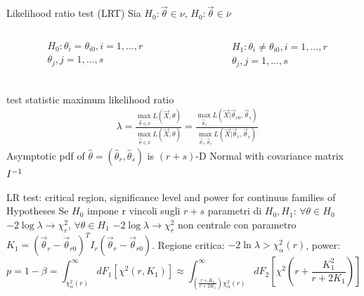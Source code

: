\documentclass[asd-beamer.tex]{subfiles}
\begin{document}
\begin{frame}{Likelihood ratio test (LRT)}\frameintoc{}
Sia $H_0: \vec{\theta}\in\nu$, $H_0: \vec{\theta}\in\overline{\nu}$
\begin{columns}[T]
\begin{column}{0.4\textwidth}
\begin{align*}
&H_0: \theta_i=\theta_{i0}, i=1,\ldots,r\\
&\theta_j, j=1,\ldots,s\\
\end{align*}
\end{column}
\begin{column}{0.6\textwidth}
\begin{align*}
&H_1: \theta_i\neq\theta_{i0}, i=1,\ldots,r\\
&\theta_j, j=1,\ldots,s
\end{align*}
\end{column}
\end{columns}
\begin{block}{test statistic maximum likelihood ratio}
\begin{align*}
&\lambda=\frac{\max_{\vec{\theta}\in\nu}L(\vec{X},\theta)}{\max_{\vec{\theta}\in\overline{\nu}}L(\vec{X},\theta)}=\frac{\max_{\vec{\theta}_s}L(\vec{X}|\vec{\theta}_{r0},\vec{\theta}_s)}{\max_{\vec{\theta}_r, \vec{\theta}_s}L(\vec{X}|\vec{\theta}_r,\vec{\theta}_s)}
\end{align*}
Asymptotic pdf of $\hat{\theta}=(\hat{\theta}_r,\hat{\theta}_s)$ is $(r+s)$-D Normal with covariance matrix ${I}^{-1}$
\end{block}
\end{frame}

\begin{frame}{LR test: critical region, significance level and power for continuus families of Hypotheses}
	Se $H_0$ impone r vincoli sugli $r+s$ parametri di $H_0, H_1$: $\forall\theta\in H_0$ $-2\log{\lambda}\to\chi^2_{r}$, $\forall\theta\in H_1$ $-2\log{\lambda}\to\chi^2_{r}$ non centrale con parametro $K_1=(\vec{\theta}_r-\vec{\theta}_{r0})^TI_r(\vec{\theta}_r-\vec{\theta}_{r0})$.
	Regione critica: $-2\ln{\lambda}>\chi^2_{\alpha}(r)$, power:
	\begin{equation*}
	p=1-\beta=\int_{\chi_{\alpha}^2(r)}^{\infty}dF_1[\chi^2(r,K_1)]\approx\int_{(\frac{r+K_1}{r+2K_1})\chi^2_{\alpha}(r)}^{\infty}dF_2[\chi^2(r+\frac{K_1^2}{r+2K_1})]
	\end{equation*}
\end{frame}
\end{document}
